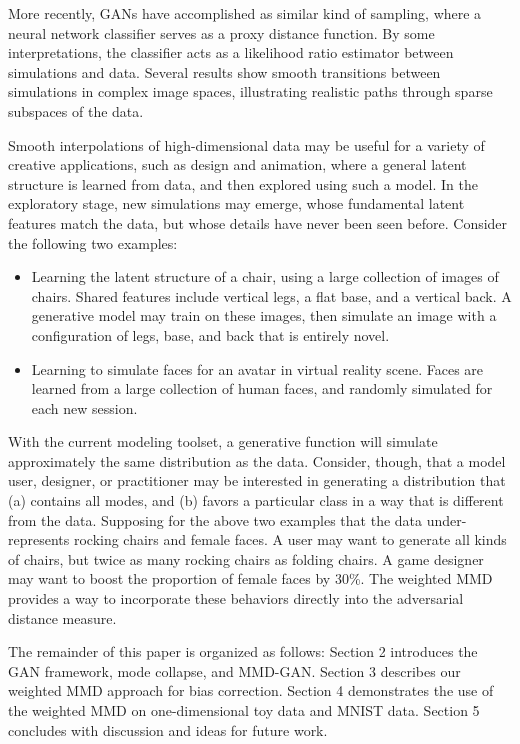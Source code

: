 \documentclass{article} %
\begin{document}
More recently, GANs have accomplished as similar kind of sampling, where a neural network classifier serves as a proxy distance function. By some interpretations, the classifier acts as a likelihood ratio estimator between simulations and data. Several results show smooth transitions between simulations in complex image spaces, illustrating realistic paths through sparse subspaces of the data.

Smooth interpolations of high-dimensional data may be useful for a variety of creative applications, such as design and animation, where a general latent structure is learned from data, and then explored using such a model. In the exploratory stage, new simulations may emerge, whose fundamental latent features match the data, but whose details have never been seen before. Consider the following two examples: 
\begin{itemize}
\item Learning the latent structure of a chair, using a large collection of images of chairs. Shared features include vertical legs, a flat base, and a vertical back. A generative model may train on these images, then simulate an image with a configuration of legs, base, and back that is entirely novel.\\
\item Learning to simulate faces for an avatar in virtual reality scene. Faces are learned from a large collection of human faces, and randomly simulated for each new session.
\end{itemize}
With the current modeling toolset, a generative function will simulate approximately the same distribution as the data. Consider, though, that a model user, designer, or practitioner may be interested in generating a distribution that (a) contains all modes, and (b) favors a particular class in a way that is different from the data. Supposing for the above two examples that the data under-represents rocking chairs and female faces. A user may want to generate all kinds of chairs, but twice as many rocking chairs as folding chairs. A game designer may want to boost the proportion of female faces by 30\%. The weighted MMD provides a way to incorporate these behaviors directly into the adversarial distance measure. 

The remainder of this paper is organized as follows: Section 2 introduces the GAN framework, mode collapse, and MMD-GAN. Section 3 describes our weighted MMD approach for bias correction. Section 4 demonstrates the use of the weighted MMD on one-dimensional toy data and MNIST data. Section 5 concludes with discussion and ideas for future work. 
\end{document}

